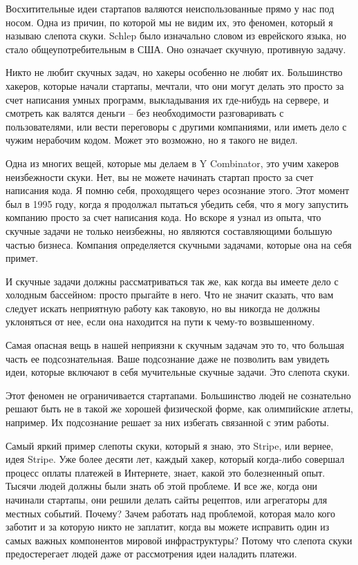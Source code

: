 \documentclass[ebook,12pt,oneside,openany]{memoir}
\begin{document}
\maketitle

Восхитительные идеи стартапов валяются неиспользованные прямо у нас
под носом. Одна из причин, по которой мы не видим их, это феномен,
который я называю слепота скуки. Schlep было изначально словом из
еврейского языка, но стало общеупотребительным в США. Оно означает
скучную, противную задачу.

Никто не любит скучных задач, но хакеры особенно не любят их.
Большинство хакеров, которые начали стартапы, мечтали, что они могут
делать это просто за счет написания умных программ, выкладывания их
где-нибудь на сервере, и смотреть как валятся деньги – без
необходимости разговаривать с пользователями, или вести переговоры с
другими компаниями, или иметь дело с чужим нерабочим кодом. Может это
возможно, но я такого не видел.

Одна из многих вещей, которые мы делаем в Y Combinator, это учим
хакеров неизбежности скуки. Нет, вы не можете начинать стартап просто
за счет написания кода. Я помню себя, проходящего через осознание
этого. Этот момент был в 1995 году, когда я продолжал пытаться убедить
себя, что я могу запустить компанию просто за счет написания кода. Но
вскоре я узнал из опыта, что скучные задачи не только неизбежны, но
являются составляющими большую частью бизнеса. Компания определяется
скучными задачами, которые она на себя примет.

И скучные задачи должны рассматриваться так же, как когда вы имеете
дело с холодным бассейном: просто прыгайте в него. Что не значит
сказать, что вам следует искать неприятную работу как таковую, но вы
никогда не должны уклоняться от нее, если она находится на пути к
чему-то возвышенному.

Самая опасная вещь в нашей неприязни к скучным задачам это то, что
большая часть ее подсознательная. Ваше подсознание даже не позволить
вам увидеть идеи, которые включают в себя мучительные скучные задачи.
Это слепота скуки.

Этот феномен не ограничивается стартапами. Большинство людей не
сознательно решают быть не в такой же хорошей физической форме, как
олимпийские атлеты, например. Их подсознание решает за них избегать
связанной с этим работы.

Самый яркий пример слепоты скуки, который я знаю, это Stripe, или
вернее, идея Stripe. Уже более десяти лет, каждый хакер, который
когда-либо совершал процесс оплаты платежей в Интернете, знает, какой
это болезненный опыт. Тысячи людей должны были знать об этой проблеме.
И все же, когда они начинали стартапы, они решили делать сайты
рецептов, или агрегаторы для местных событий. Почему? Зачем работать
над проблемой, которая мало кого заботит и за которую никто не
заплатит, когда вы можете исправить один из самых важных компонентов
мировой инфраструктуры? Потому что слепота скуки предостерегает людей
даже от рассмотрения идеи наладить платежи.
\end{document}

